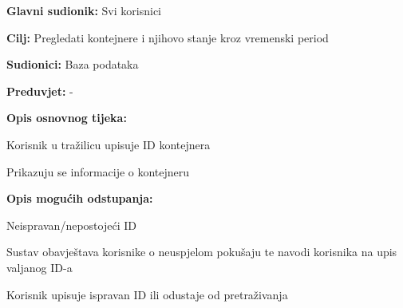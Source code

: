 			\noindent {}
			\begin{packed_item}
				
				\item \textbf{Glavni sudionik:} Svi korisnici
				\item  \textbf{Cilj:} Pregledati kontejnere i njihovo stanje kroz vremenski period
				\item  \textbf{Sudionici:} Baza podataka
				\item  \textbf{Preduvjet:} -
				\item  \textbf{Opis osnovnog tijeka:}
				
				\item[] \begin{packed_enum}
					
					\item Korisnik u tražilicu upisuje ID kontejnera
					\item Prikazuju se informacije o kontejneru
					
				\end{packed_enum}
				
				\item  \textbf{Opis mogućih odstupanja:}
				
				\item[] \begin{packed_item}
					
					\item[2.a] Neispravan/nepostojeći ID
					\item[] \begin{packed_enum}
						
						\item Sustav obavještava korisnike o neuspjelom pokušaju te navodi korisnika na upis valjanog ID-a
						\item Korisnik upisuje ispravan ID ili odustaje od pretraživanja
					\end{packed_enum}
					
				\end{packed_item}
			\end{packed_item}
			
